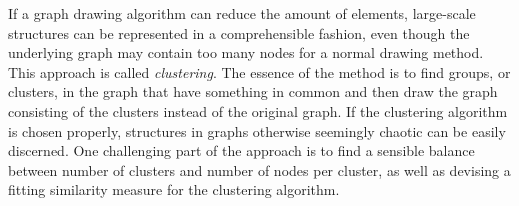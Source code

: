 If a graph drawing algorithm can reduce the amount of elements, large-scale
structures can be represented in a comprehensible fashion, even though the
underlying graph may contain too many nodes for a normal drawing method. This
approach is called \emph{clustering}. The essence of the method is to find
groups, or clusters, in the graph that have something in common and then draw
the graph consisting of the clusters instead of the original graph. If the
clustering algorithm is chosen properly, structures in graphs otherwise
seemingly chaotic can be easily discerned. One challenging part of the
approach is to find a sensible balance between number of clusters and number
of nodes per cluster, as well as devising a fitting similarity measure for the
clustering algorithm. 







